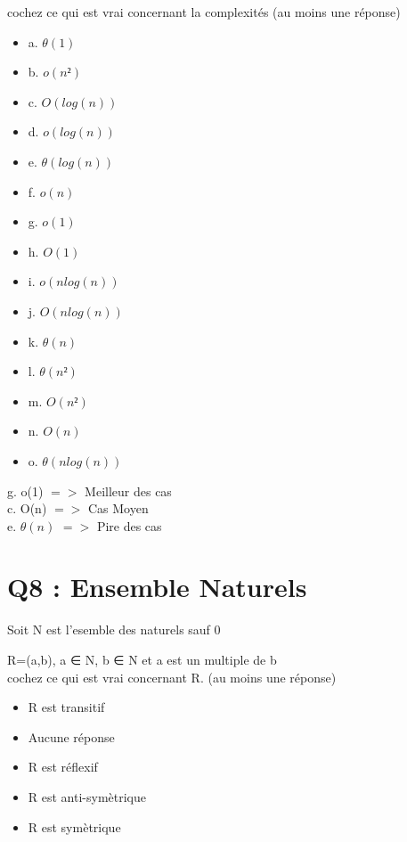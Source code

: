 cochez ce qui est vrai concernant la complexités (au moins une réponse)\\
\begin{itemize}[label=$\square$]
\item {a. $\theta(1)$}
\item {b. $o(n²)$}
\item {c. $O(log(n))$}
\item {d. $o(log(n))$}
\item {e. $\theta(log(n))$}
\item {f. $o(n)$}
\item {g. $o(1)$}
\item {h. $O(1)$}
\item {i. $o(n log(n))$}
\item {j. $O(n log(n))$}
\item {k. $\theta(n)$}
\item {l. $\theta(n²)$}
\item {m. $O(n²)$}
\item {n. $O(n)$}
\item {o. $\theta(n log(n))$}
\end{itemize}

\vspace{5mm} %

g. o(1) $=>$ Meilleur des cas \\

c. O(n) $=>$ Cas Moyen \\

e. $\theta(n)$ $=>$ Pire des cas \\



\newpage
\section{Q8 : Ensemble Naturels}
\vspace{5mm} %

Soit N est l’esemble des naturels sauf 0

  R={(a,b), a ∈ N, b ∈ N et a est un multiple de b }\\


cochez ce qui est vrai concernant R. (au moins une réponse)\\
\begin{itemize}[label=$\square$]
\item R est transitif
\item Aucune réponse
\item R est réflexif
\item R est anti-symètrique
\item R est symètrique
\end{itemize}

